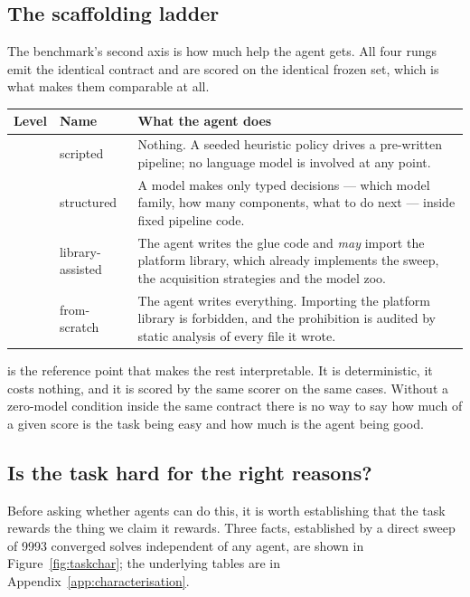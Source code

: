 \subsection{The scaffolding ladder}
\label{sec:ladder}

The benchmark's second axis is how much help the agent gets. All four rungs emit
the identical contract and are scored on the identical frozen set, which is what
makes them comparable at all.

\begin{center}
\footnotesize
\begin{tabular}{@{}llp{}@{}}
\toprule
\textbf{Level} & \textbf{Name} & \textbf{What the agent does} \\
\midrule
\Lzero{}  & scripted         & Nothing. A seeded heuristic policy drives a pre-written pipeline; no language model is involved at any point. \\
\Lone{}   & structured       & A model makes only typed decisions --- which model family, how many components, what to do next --- inside fixed pipeline code. \\
\Ltwo{}   & library-assisted & The agent writes the glue code and \emph{may} import the platform library, which already implements the sweep, the acquisition strategies and the model zoo. \\
\Lthree{} & from-scratch     & The agent writes everything. Importing the platform library is forbidden, and the prohibition is audited by static analysis of every file it wrote. \\
\bottomrule
\end{tabular}
\end{center}

\Lzero{} is the reference point that makes the rest interpretable. It is
deterministic, it costs nothing, and it is scored by the same scorer on the same
cases. Without a zero-model condition inside the same contract there is no way
to say how much of a given score is the task being easy and how much is the
agent being good.

\subsection{Is the task hard for the right reasons?}
\label{sec:characterisation}

Before asking whether agents can do this, it is worth establishing that the
task rewards the thing we claim it rewards. Three facts, established by a
direct sweep of 9993 converged solves independent of any agent, are shown in
Figure~\ref{fig:taskchar}; the underlying tables are in
Appendix~\ref{app:characterisation}.

